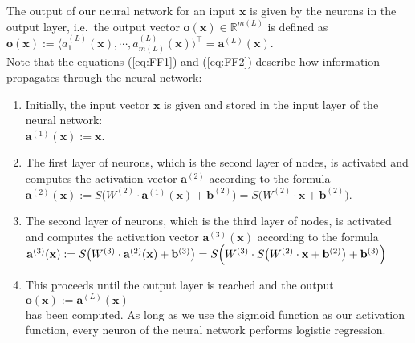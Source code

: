 The output of our neural network for an input $\mathbf{x}$ is given by the neurons in the output
layer,  i.e.~the output vector 
$\mathbf{o}(\mathbf{x}) \in \mathbb{R}^{m(L)}$ is defined as 
\\[0.2cm]
\hspace*{1.3cm}
$\mathbf{o}(\mathbf{x}) := \langle a^{(L)}_1(\mathbf{x}), \cdots, a^{(L)}_{m(L)}(\mathbf{x}) \rangle^\top = \mathbf{a}^{(L)}(\mathbf{x})$.
\\[0.2cm]
Note that the equations (\ref{eq:FF1}) and (\ref{eq:FF2}) describe how information propagates
through the neural network: 
\begin{enumerate}
\item Initially, the input vector $\mathbf{x}$ is given and stored in the input layer of the neural network:
      \\[0.2cm]
      \hspace*{1.3cm}
      $\mathbf{a}^{(1)}(\mathbf{x}) := \mathbf{x}$.
\item The first layer of neurons, which is the second layer of nodes,  is activated and computes the activation
      vector $\mathbf{a}^{(2)}$ according to the formula
      \\[0.2cm]
      \hspace*{1.3cm}
      $\mathbf{a}^{(2)}(\mathbf{x}) := S\bigl(W^{(2)} \cdot \mathbf{a}^{(1)}(\mathbf{x}) + \mathbf{b}^{(2)}\bigr) = 
                                        S\bigl(W^{(2)} \cdot \mathbf{x} + \mathbf{b}^{(2)}\bigr)
      $.
\item The second layer of neurons, which is the third layer of nodes,  is activated and computes the activation
      vector $\mathbf{a}^{(3)}(\mathbf{x})$ according to the formula
      \\[0.2cm]
      \hspace*{1.3cm}
      $\mathbf{a}^{(3)}(\mathbf{x}) := S\bigl(W^{(3)} \cdot \mathbf{a}^{(2)}(\mathbf{x}) + \mathbf{b}^{(3)}\bigr)
                          = S\Bigl(W^{(3)} \cdot S\bigl(W^{(2)} \cdot \mathbf{x} + \mathbf{b}^{(2)}\bigr) + \mathbf{b}^{(3)}\Bigr)
        $
\item This proceeds until the output layer is reached and the output
      \\[0.2cm]
      \hspace*{1.3cm}
      $\mathbf{o}(\mathbf{x}) := \mathbf{a}^{(L)}(\mathbf{x})$
      \\[0.2cm]
      has been computed.  As long as we use the sigmoid function as our activation function, every neuron of
      the neural network performs logistic regression. 
\end{enumerate}
